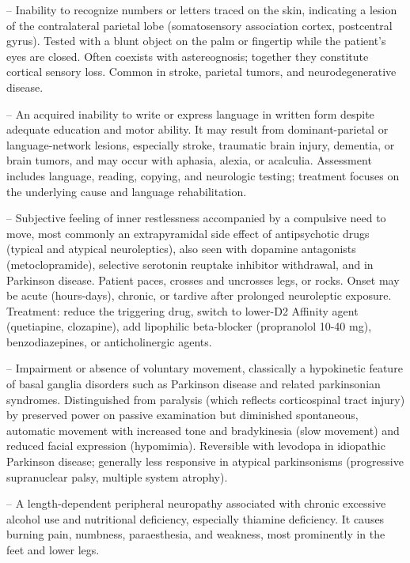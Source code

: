 -- Inability to recognize numbers or letters traced on the skin, indicating a lesion of the contralateral parietal lobe (somatosensory association cortex, postcentral gyrus). Tested with a blunt object on the palm or fingertip while the patient's eyes are closed. Often coexists with astereognosis; together they constitute cortical sensory loss. Common in stroke, parietal tumors, and neurodegenerative disease.

-- An acquired inability to write or express language in written form despite adequate education and motor ability. It may result from dominant-parietal or language-network lesions, especially stroke, traumatic brain injury, dementia, or brain tumors, and may occur with aphasia, alexia, or acalculia. Assessment includes language, reading, copying, and neurologic testing; treatment focuses on the underlying cause and language rehabilitation.

-- Subjective feeling of inner restlessness accompanied by a compulsive need to move, most commonly an extrapyramidal side effect of antipsychotic drugs (typical and atypical neuroleptics), also seen with dopamine antagonists (metoclopramide), selective serotonin reuptake inhibitor withdrawal, and in Parkinson disease. Patient paces, crosses and uncrosses legs, or rocks. Onset may be acute (hours-days), chronic, or tardive after prolonged neuroleptic exposure. Treatment: reduce the triggering drug, switch to lower-D2 Affinity agent (quetiapine, clozapine), add lipophilic beta-blocker (propranolol 10-40 mg), benzodiazepines, or anticholinergic agents.

-- Impairment or absence of voluntary movement, classically a hypokinetic feature of basal ganglia disorders such as Parkinson disease and related parkinsonian syndromes. Distinguished from paralysis (which reflects corticospinal tract injury) by preserved power on passive examination but diminished spontaneous, automatic movement with increased tone and bradykinesia (slow movement) and reduced facial expression (hypomimia). Reversible with levodopa in idiopathic Parkinson disease; generally less responsive in atypical parkinsonisms (progressive supranuclear palsy, multiple system atrophy).

-- A length-dependent peripheral neuropathy associated with chronic excessive alcohol use and nutritional deficiency, especially thiamine deficiency. It causes burning pain, numbness, paraesthesia, and weakness, most prominently in the feet and lower legs.

